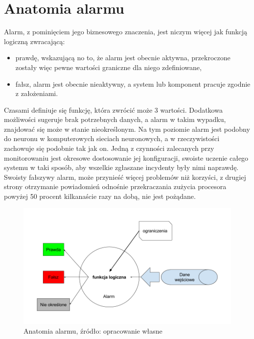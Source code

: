 \section{Anatomia alarmu}
\label{chapter:monitoring:anatomy_of_alarm}

    Alarm, z pominięciem jego biznesowego znaczenia, jest niczym więcej jak funkcją logiczną zwracającą:
    \begin{itemize}
        \item prawdę, wskazującą no to, że alarm jest obecnie aktywna, przekroczone zostały więc
        pewne wartości graniczne dla niego zdefiniowane,
        \item fałsz, alarm jest obecnie nieaktywny, a system lub komponent pracuje zgodnie z założeniami.
    \end{itemize}
    Czasami definiuje się funkcję, która zwrócić może 3 wartości. Dodatkowa możliwości sugeruje brak 
    potrzebnych danych, a alarm w takim wypadku, znajdować się może w stanie nieokreślonym. Na tym poziomie alarm
    jest podobny do neuronu w komputerowych sieciach neuronowych, a w rzeczywistości zachowuje się podobnie tak jak on.
    Jedną z czynności zalecanych przy monitorowaniu jest okresowe dostosowanie jej konfiguracji, swoiste uczenie całego
    systemu w taki sposób, aby wszelkie zgłaszane incydenty były nimi naprawdę. Swoisty fałszywy alarm, może
    przynieść więcej problemów niż korzyści, z drugiej strony otrzymanie powiadomień odnośnie przekraczania zużycia
    procesora powyżej 50 procent kilkanaście razy na dobą, nie jest pożądane. 
    
    \begin{figure}[H]
        \centering
        \includegraphics[width=1.0\textwidth]{images/alarm_anatomy}
        \caption[Anatomia alarmu]{Anatomia alarmu, źródło: {opracowanie własne}}
        \label{chapter:monitoring:anatomy_of_alarm:picture}
    \end{figure}
   
